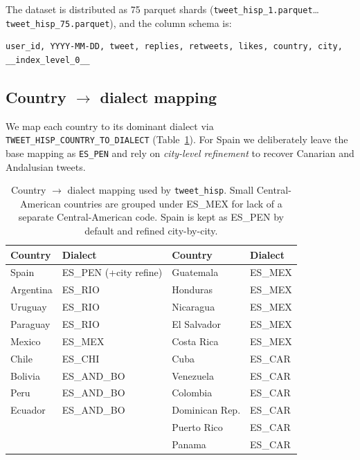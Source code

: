 \documentclass[11pt,a4paper]{article}
\begin{document}
The dataset is distributed as 75 parquet shards
(\texttt{tweet\_hisp\_1.parquet}\ldots\texttt{tweet\_hisp\_75.parquet}),
and the column schema is:

\begin{lstlisting}[style=shellcode]
user_id, YYYY-MM-DD, tweet, replies, retweets, likes, country, city, __index_level_0__
\end{lstlisting}

\subsection{Country $\rightarrow$ dialect mapping}

We map each country to its dominant dialect via
\texttt{TWEET\_HISP\_COUNTRY\_TO\_DIALECT} (Table~\ref{tab:country-map}).
For Spain we deliberately leave the base mapping as \texttt{ES\_PEN} and
rely on \emph{city-level refinement} to recover Canarian and Andalusian
tweets.

\begin{table}[h]
\centering\small
\begin{tabular}{l l l l}
\toprule
\textbf{Country} & \textbf{Dialect} & \textbf{Country} & \textbf{Dialect} \\
\midrule
Spain           & ES\_PEN (+city refine) & Guatemala & ES\_MEX \\
Argentina       & ES\_RIO & Honduras & ES\_MEX \\
Uruguay         & ES\_RIO & Nicaragua & ES\_MEX \\
Paraguay        & ES\_RIO & El Salvador & ES\_MEX \\
Mexico          & ES\_MEX & Costa Rica & ES\_MEX \\
Chile           & ES\_CHI & Cuba & ES\_CAR \\
Bolivia         & ES\_AND\_BO & Venezuela & ES\_CAR \\
Peru            & ES\_AND\_BO & Colombia & ES\_CAR \\
Ecuador         & ES\_AND\_BO & Dominican Rep. & ES\_CAR \\
                &             & Puerto Rico & ES\_CAR \\
                &             & Panama & ES\_CAR \\
\bottomrule
\end{tabular}
\caption{Country $\rightarrow$ dialect mapping used by
\texttt{tweet\_hisp}. Small Central-American countries are grouped under
ES\_MEX for lack of a separate Central-American code. Spain is kept as
ES\_PEN by default and refined city-by-city.}
\label{tab:country-map}
\end{table}
\end{document}
